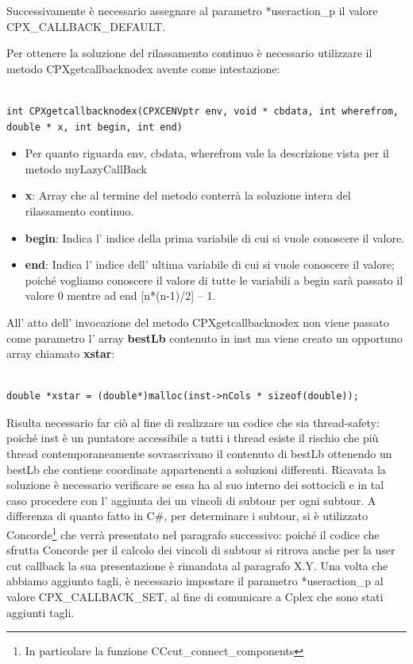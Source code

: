 \documentclass[11pt]{article}
\begin{document}
Successivamente è necessario assegnare al parametro *useraction_p il valore CPX_CALLBACK_DEFAULT.


Per ottenere  la soluzione del rilassamento continuo  è necessario utilizzare il metodo CPXgetcallbacknodex avente come intestazione:

\begin{lstlisting}

int CPXgetcallbacknodex(CPXCENVptr env, void * cbdata, int wherefrom, double * x, int begin, int end) 

\end{lstlisting}


\begin{itemize}
	\item Per quanto riguarda env, cbdata, wherefrom vale la descrizione vista per il metodo myLazyCallBack
	\item \textbf{x}: Array che al termine del metodo conterrà la soluzione intera del rilassamento continuo.
	\item \textbf{begin}: Indica l’ indice della prima variabile di cui si vuole conoscere il valore.
	\item \textbf{end}: Indica l’ indice dell’ ultima variabile di cui si vuole conoscere il valore; poiché vogliamo conoscere il valore di tutte le variabili a begin sarà passato il valore 0 mentre ad end [n*(n-1)/2] – 1.
\end{itemize}

All' atto dell' invocazione del metodo CPXgetcallbacknodex non viene passato come parametro l' array \textbf{bestLb} contenuto in inst ma viene creato un opportuno array chiamato \textbf{xstar}:


\begin{lstlisting}

double *xstar = (double*)malloc(inst->nCols * sizeof(double));

\end{lstlisting}

Risulta necessario far ciò al fine di realizzare un codice che sia thread-safety: poiché inst è un puntatore accessibile a tutti i thread esiste il rischio che più thread contemporaneamente sovrascrivano il contenuto di bestLb ottenendo un bestLb che contiene coordinate appartenenti a soluzioni differenti.
Ricavata la soluzione è necessario verificare se essa ha al suo interno dei sottocicli e in tal caso procedere con l’ aggiunta dei un vincoli di subtour per ogni subtour. A differenza di quanto fatto in C\#, per determinare i subtour, si è utilizzato Concorde\footnote{ In particolare la funzione CCcut_connect_components } che verrà presentato nel paragrafo successivo: poiché il codice che sfrutta Concorde per il calcolo dei vincoli di subtour si ritrova anche per la user cut callback la sua presentazione è rimandata al paragrafo X.Y.
Una volta che abbiamo aggiunto tagli, è necessario impostare il parametro *useraction_p al valore CPX_CALLBACK_SET, al fine di comunicare a Cplex che sono stati aggiunti tagli. 
\end{document}
